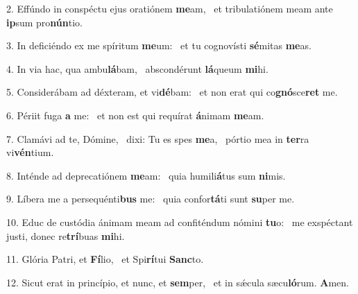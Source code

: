 2. Effúndo in conspéctu ejus oratiónem \textbf{me}am, \ast\  et tribulatiónem meam ante \textbf{ip}sum pro\textbf{nún}tio.\

3. In deficiéndo ex me spíritum \textbf{me}um: \ast\  et tu cognovísti \textbf{sé}mitas \textbf{me}as.\

4. In via hac, qua ambu\textbf{lá}bam, \ast\  abscondérunt \textbf{lá}queum \textbf{mi}hi.\

5. Considerábam ad déxteram, et vi\textbf{dé}bam: \ast\  et non erat qui co\textbf{gnó}sce\textbf{ret} me.\

6. Périit fuga \textbf{a} me: \ast\  et non est qui requírat \textbf{á}nimam \textbf{me}am.\

7. Clamávi ad te, Dómine, \dag\  dixi: Tu es spes \textbf{me}a, \ast\  pórtio mea in \textbf{ter}ra vi\textbf{vén}tium.\

8. Inténde ad deprecatiónem \textbf{me}am: \ast\  quia humili\textbf{á}tus sum \textbf{ni}mis.\

9. Líbera me a persequénti\textbf{bus} me: \ast\  quia confor\textbf{tá}ti sunt \textbf{su}per me.\

10. Educ de custódia ánimam meam ad confiténdum nómini \textbf{tu}o: \ast\  me exspéctant justi, donec re\textbf{trí}buas \textbf{mi}hi.\

11. Glória Patri, et \textbf{Fí}lio, \ast\  et Spi\textbf{rí}tui \textbf{Sanc}to.\

12. Sicut erat in princípio, et nunc, et \textbf{sem}per, \ast\  et in sǽcula sæcu\textbf{ló}rum. \textbf{A}men.\

